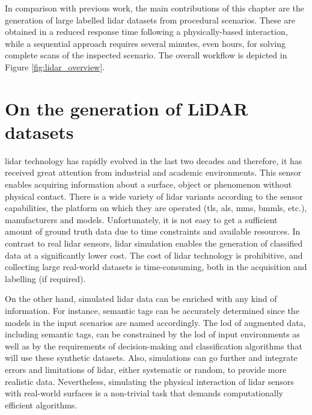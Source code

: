 In comparison with previous work, the main contributions of this chapter are the generation of large labelled \acrshort{lidar} datasets from procedural scenarios. These are obtained in a reduced response time following a physically-based interaction, while a sequential approach requires several minutes, even hours, for solving complete scans of the inspected scenario. The overall workflow is depicted in Figure \ref{fig:lidar_overview}. 

\section{On the generation of LiDAR datasets}

\acrshort{lidar} technology has rapidly evolved in the last two decades and therefore, it has received great attention from industrial and academic environments. This sensor enables acquiring information about a surface, object or phenomenon without physical contact. There is a wide variety of \acrshort{lidar} variants according to the sensor capabilities, the platform on which they are operated (\acrshort{tls}, \acrshort{als}, \acrshort{mms}, \acrshort{bmmls}, etc.), manufacturers and models. Unfortunately, it is not easy to get a sufficient amount of ground truth data due to time constraints and available resources. In contrast to real \acrshort{lidar} sensors, \acrshort{lidar} simulation enables the generation of classified data at a significantly lower cost. The cost of \acrshort{lidar} technology is prohibitive, and collecting large real-world datasets is time-consuming, both in the acquisition and labelling (if required). 

On the other hand, simulated \acrshort{lidar} data can be enriched with any kind of information. For instance, semantic tags can be accurately determined since the models in the input scenarios are named accordingly. The \acrshort{lod} of augmented data, including semantic tags, can be constrained by the \acrshort{lod} of input environments as well as by the requirements of decision-making and classification algorithms that will use these synthetic datasets. Also, simulations can go further and integrate errors and limitations of \acrshort{lidar}, either systematic or random, to provide more realistic data. Nevertheless, simulating the physical interaction of \acrshort{lidar} sensors with real-world surfaces is a non-trivial task that demands computationally efficient algorithms. 

